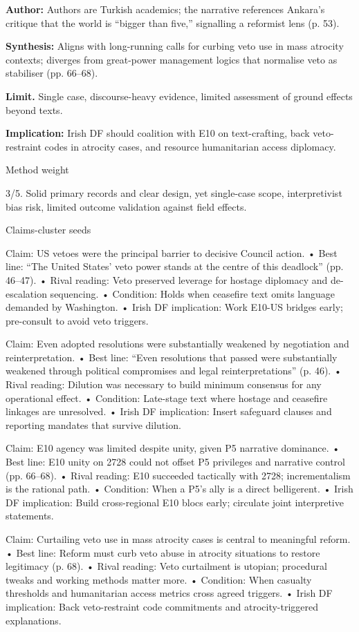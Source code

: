 \textbf{Author:} Authors are Turkish academics; the narrative references Ankara’s critique that the world is “bigger than five,” signalling a reformist lens (p. 53).

\textbf{Synthesis:} Aligns with long-running calls for curbing veto use in mass atrocity contexts; diverges from great-power management logics that normalise veto as stabiliser (pp. 66–68).

\textbf{Limit.} Single case, discourse-heavy evidence, limited assessment of ground effects beyond texts.

\textbf{Implication:} Irish DF should coalition with E10 on text-crafting, back veto-restraint codes in atrocity cases, and resource humanitarian access diplomacy.

Method weight

3/5. Solid primary records and clear design, yet single-case scope, interpretivist bias risk, limited outcome validation against field effects.

Claims-cluster seeds

Claim: US vetoes were the principal barrier to decisive Council action.
• Best line: “The United States’ veto power stands at the centre of this deadlock” (pp. 46–47).
• Rival reading: Veto preserved leverage for hostage diplomacy and de-escalation sequencing.
• Condition: Holds when ceasefire text omits language demanded by Washington.
• Irish DF implication: Work E10-US bridges early; pre-consult to avoid veto triggers.

Claim: Even adopted resolutions were substantially weakened by negotiation and reinterpretation.
• Best line: “Even resolutions that passed were substantially weakened through political compromises and legal reinterpretations” (p. 46).
• Rival reading: Dilution was necessary to build minimum consensus for any operational effect.
• Condition: Late-stage text where hostage and ceasefire linkages are unresolved.
• Irish DF implication: Insert safeguard clauses and reporting mandates that survive dilution.

Claim: E10 agency was limited despite unity, given P5 narrative dominance.
• Best line: E10 unity on 2728 could not offset P5 privileges and narrative control (pp. 66–68).
• Rival reading: E10 succeeded tactically with 2728; incrementalism is the rational path.
• Condition: When a P5’s ally is a direct belligerent.
• Irish DF implication: Build cross-regional E10 blocs early; circulate joint interpretive statements.

Claim: Curtailing veto use in mass atrocity cases is central to meaningful reform.
• Best line: Reform must curb veto abuse in atrocity situations to restore legitimacy (p. 68).
• Rival reading: Veto curtailment is utopian; procedural tweaks and working methods matter more.
• Condition: When casualty thresholds and humanitarian access metrics cross agreed triggers.
• Irish DF implication: Back veto-restraint code commitments and atrocity-triggered explanations.

